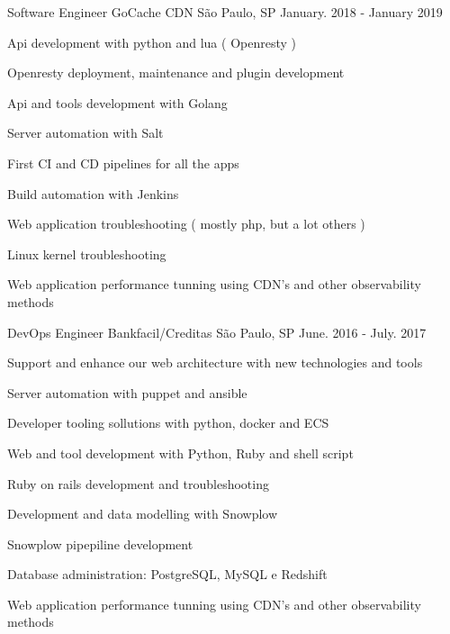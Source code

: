 \begin{cventries}
  \cventry
    {Software Engineer} %
    {GoCache CDN} %
    {São Paulo, SP} %
    {January. 2018 - January 2019} %
    {
      \begin{cvitems} %
       \item {Api development with python and lua ( Openresty )}
       \item {Openresty deployment, maintenance and plugin development}
       \item {Api and tools development with Golang}
       \item {Server automation with Salt}
       \item {First CI and CD pipelines for all the apps }
       \item {Build automation with Jenkins}
       \item {Web application troubleshooting ( mostly php, but a lot others )}
       \item {Linux kernel troubleshooting}
       \item {Web application performance tunning using CDN's and other observability methods}
      \end{cvitems}
    }

  \cventry
    {DevOps Engineer} %
    {Bankfacil/Creditas} %
    {São Paulo, SP} %
    {June. 2016 - July. 2017} %
    {
      \begin{cvitems} %
      \item {Support and enhance our web architecture with new technologies and tools}
      \item {Server automation with puppet and ansible}
      \item {Developer tooling sollutions with python, docker and ECS}
      \item {Web and tool development with Python, Ruby and shell script}
      \item {Ruby on rails development and troubleshooting}
      \item {Development and data modelling with Snowplow}
      \item {Snowplow pipepiline development}
      \item {Database administration: PostgreSQL, MySQL e Redshift}
      \item {Web application performance tunning using CDN's and other observability methods}
\end{cvitems}
    }


\end{cventries}
